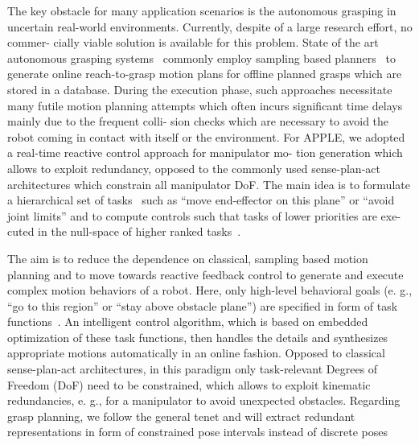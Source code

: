 The key obstacle for many application scenarios is the autonomous grasping in uncertain real-world
environments. Currently, despite of a large research effort, no commer- cially viable solution is
available for this problem. State of the art autonomous grasping systems~\cite{Bere07, Srin10,
  Krug14a} commonly employ sampling based planners~\cite{LaVa06} to generate online reach-to-grasp
motion plans for offline planned grasps which are stored in a database.  During the execution phase,
such approaches necessitate many futile motion planning attempts which often incurs significant time
delays mainly due to the frequent colli- sion checks which are necessary to avoid the robot coming
in contact with itself or the environment.  For APPLE, we adopted a real-time reactive control
approach for manipulator mo- tion generation which allows to exploit redundancy, opposed to the
commonly used sense-plan-act architectures which constrain all manipulator DoF. The main idea is to
formulate a hierarchical set of tasks~\cite{Sams91} such as “move end-effector on this plane” or
“avoid joint limits” and to compute controls such that tasks of lower priorities are exe- cuted in
the null-space of higher ranked tasks~\cite{Sici91, Sent10}.

The aim is to reduce the dependence on classical, sampling based motion planning and to move towards
reactive feedback control to generate and execute complex motion behaviors of a robot.  Here, only
high-level behavioral goals (e. g., “go to this region” or “stay above obstacle plane”) are
specified in form of task functions~\cite{Sams91}. An intelligent control algorithm, which is based
on embedded optimization of these task functions, then handles the details and synthesizes
appropriate motions automatically in an online fashion. Opposed to classical sense-plan-act
architectures, in this paradigm only task-relevant Degrees of Freedom (DoF) need to be constrained,
which allows to exploit kinematic redundancies, e. g., for a manipulator to avoid unexpected
obstacles. Regarding grasp planning, we follow the general tenet and will extract redundant
representations in form of constrained pose intervals instead of discrete poses
